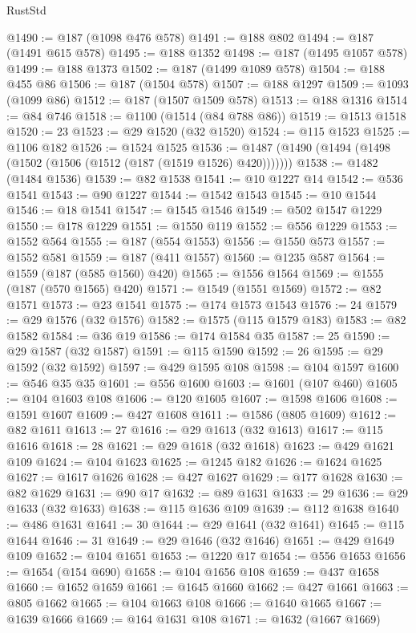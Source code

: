 \begin{lexlean}{RustStd}
\begin{coremodule}
{\begin{coremodule}
{{{{{{{{{{{{{{{{{{{{{{{{{{{{{{{{{{{{{{{{{{{{{{{{{{{{{{{@1490 := @187 (@1098 @476 @578)
@1491 := @188 @802
@1494 := @187 (@1491 @615 @578)
@1495 := @188 @1352
@1498 := @187 (@1495 @1057 @578)
@1499 := @188 @1373
@1502 := @187 (@1499 @1089 @578)
@1504 := @188 @455 @86
@1506 := @187 (@1504 @578)
@1507 := @188 @1297
@1509 := @1093 (@1099 @86)
@1512 := @187 (@1507 @1509 @578)
@1513 := @188 @1316
@1514 := @84 @746
@1518 := @1100 (@1514 (@84 @788 @86))
@1519 := @1513 @1518
@1520 := 23
@1523 := @29 @1520 (@32 @1520)
@1524 := @115 @1523
@1525 := @1106 @182
@1526 := @1524 @1525
@1536 := @1487 (@1490 (@1494 (@1498 (@1502 (@1506 (@1512 (@187 (@1519 @1526) @420)))))))
@1538 := @1482 (@1484 @1536)
@1539 := @82 @1538
@1541 := @10 @1227 @14
@1542 := @536 @1541
@1543 := @90 @1227
@1544 := @1542 @1543
@1545 := @10 @1544
@1546 := @18 @1541
@1547 := @1545 @1546
@1549 := @502 @1547 @1229
@1550 := @178 @1229
@1551 := @1550 @119
@1552 := @556 @1229
@1553 := @1552 @564
@1555 := @187 (@554 @1553)
@1556 := @1550 @573
@1557 := @1552 @581
@1559 := @187 (@411 @1557)
@1560 := @1235 @587
@1564 := @1559 (@187 (@585 @1560) @420)
@1565 := @1556 @1564
@1569 := @1555 (@187 (@570 @1565) @420)
@1571 := @1549 (@1551 @1569)
@1572 := @82 @1571
@1573 := @23 @1541
@1575 := @174 @1573 @1543
@1576 := 24
@1579 := @29 @1576 (@32 @1576)
@1582 := @1575 (@115 @1579 @183)
@1583 := @82 @1582
@1584 := @36 @19
@1586 := @174 @1584 @35
@1587 := 25
@1590 := @29 @1587 (@32 @1587)
@1591 := @115 @1590
@1592 := 26
@1595 := @29 @1592 (@32 @1592)
@1597 := @429 @1595 @108
@1598 := @104 @1597
@1600 := @546 @35 @35
@1601 := @556 @1600
@1603 := @1601 (@107 @460)
@1605 := @104 @1603 @108
@1606 := @120 @1605
@1607 := @1598 @1606
@1608 := @1591 @1607
@1609 := @427 @1608
@1611 := @1586 (@805 @1609)
@1612 := @82 @1611
@1613 := 27
@1616 := @29 @1613 (@32 @1613)
@1617 := @115 @1616
@1618 := 28
@1621 := @29 @1618 (@32 @1618)
@1623 := @429 @1621 @109
@1624 := @104 @1623
@1625 := @1245 @182
@1626 := @1624 @1625
@1627 := @1617 @1626
@1628 := @427 @1627
@1629 := @177 @1628
@1630 := @82 @1629
@1631 := @90 @17
@1632 := @89 @1631
@1633 := 29
@1636 := @29 @1633 (@32 @1633)
@1638 := @115 @1636 @109
@1639 := @112 @1638
@1640 := @486 @1631
@1641 := 30
@1644 := @29 @1641 (@32 @1641)
@1645 := @115 @1644
@1646 := 31
@1649 := @29 @1646 (@32 @1646)
@1651 := @429 @1649 @109
@1652 := @104 @1651
@1653 := @1220 @17
@1654 := @556 @1653
@1656 := @1654 (@154 @690)
@1658 := @104 @1656 @108
@1659 := @437 @1658
@1660 := @1652 @1659
@1661 := @1645 @1660
@1662 := @427 @1661
@1663 := @805 @1662
@1665 := @104 @1663 @108
@1666 := @1640 @1665
@1667 := @1639 @1666
@1669 := @164 @1631 @108
@1671 := @1632 (@1667 @1669)
}}}}}}}}}}}}}}}}}}}}}}}}}}}}}}}}}}}}}}}}}}}}}}}}}}}}}}}
\end{coremodule}}
\end{coremodule}
\end{lexlean}
